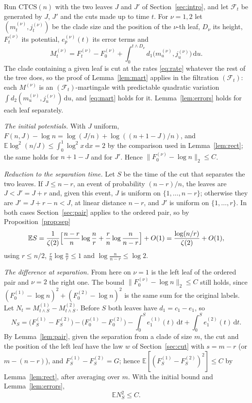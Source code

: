\documentclass[11pt]{amsart}
\theoremstyle{remark}
\numberwithin{equation}{section}
\newcommand{\E}{\mathbb E}
\newcommand{\dd}{\,\mathrm d}
\begin{document}
Run $\mathrm{CTCS}(n)$ with the two leaves $J$ and $J'$ of Section~\ref{sec:intro}, and let $\mathcal F_t$ be generated by $J$, $J'$ and the cuts made up to time $t$. For $\nu=1,2$ let $(m^{(\nu)}_t,j^{(\nu)}_t)$ be the clade size and the position of the $\nu$-th leaf, $D_\nu$ its height, $F^{(\nu)}_t$ its potential, $e^{(\nu)}_p(t)$ its error terms and
\[
M^{(\nu)}_t=F^{(\nu)}_t-F^{(\nu)}_0+\int_0^{t\wedge D_\nu}d_1\bigl(m^{(\nu)}_u,j^{(\nu)}_u\bigr)\dd u .
\]
The clade containing a given leaf is cut at the rates \eqref{eq:rate} whatever the rest of the tree does, so the proof of Lemma~\ref{lem:mart} applies in the filtration $(\mathcal F_t)$: each $M^{(\nu)}$ is an $(\mathcal F_t)$-martingale with predictable quadratic variation $\int d_2(m^{(\nu)}_u,j^{(\nu)}_u)\dd u$, and \eqref{eq:mart} holds for it. Lemma~\ref{lem:errors} holds for each leaf separately.

\emph{The initial potentials.} With $J$ uniform, $F(n,J)-\log n=\log(J/n)+\log((n+1-J)/n)$, and $\E\log^2(n/J)\le\int_0^1\log^2x\dd x=2$ by the comparison used in Lemma~\ref{lem:rect}; the same holds for $n+1-J$ and for $J'$. Hence $\|F^{(\nu)}_0-\log n\|_2\le C$.

\emph{Reduction to the separation time.} Let $S$ be the time of the cut that separates the two leaves. If $J\le n-r$, an event of probability $(n-r)/n$, the leaves are $J<J'=J+r$ and, given this event, $J$ is uniform on $\{1,\dots,n-r\}$; otherwise they are $J'=J+r-n<J$, at linear distance $n-r$, and $J'$ is uniform on $\{1,\dots,r\}$. In both cases Section~\ref{sec:pair} applies to the ordered pair, so by Proposition~\ref{prop:sep}
\begin{equation}\label{eq:ES}
\E S=\frac1{\zeta(2)}\Bigl[\frac{n-r}n\log\frac nr+\frac rn\log\frac n{n-r}\Bigr]+O(1)=\frac{\log(n/r)}{\zeta(2)}+O(1),
\end{equation}
using $r\le n/2$, $\frac rn\log\frac nr\le1$ and $\log\frac n{n-r}\le\log2$.

\emph{The difference at separation.} From here on $\nu=1$ is the left leaf of the ordered pair and $\nu=2$ the right one. The bound $\|F^{(\nu)}_0-\log n\|_2\le C$ still holds, since $(F^{(1)}_0-\log n)^2+(F^{(2)}_0-\log n)^2$ is the same sum for the original labels. Let $N_t=M^{(1)}_{t\wedge S}-M^{(2)}_{t\wedge S}$. Before $S$ both leaves have $d_1=c_1-e_1$, so
\[
N_S=\bigl(F^{(1)}_S-F^{(2)}_S\bigr)-\bigl(F^{(1)}_0-F^{(2)}_0\bigr)-\int_0^Se^{(1)}_1(t)\dd t+\int_0^Se^{(2)}_1(t)\dd t .
\]
By Lemma~\ref{lem:pair}, given the separation from a clade of size $m$, the cut and the position of the left leaf have the law $w$ of Section~\ref{sec:cut} with $s=m-r$ (or $m-(n-r)$), and $F^{(1)}_S-F^{(2)}_S=G$; hence $\E[(F^{(1)}_S-F^{(2)}_S)^2]\le C$ by Lemma~\ref{lem:rect}, after averaging over $m$. With the initial bound and Lemma~\ref{lem:errors},
\begin{equation}\label{eq:NS}
\E N_S^2\le C .
\end{equation}
\end{document}
